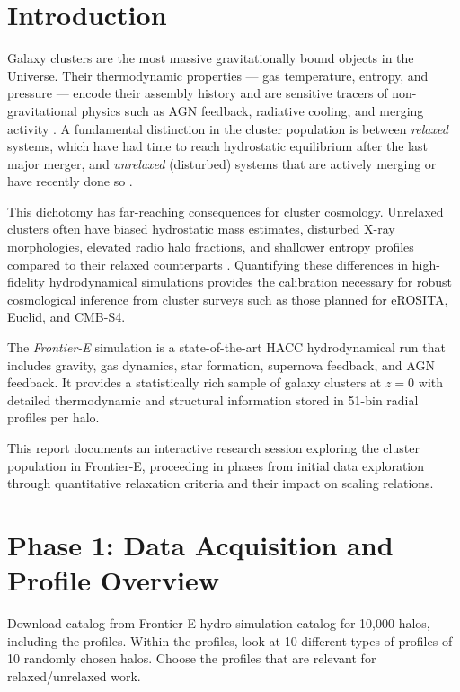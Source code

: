 \documentclass[12pt,a4paper]{article}
\begin{document}
\tableofcontents
\clearpage

\section{Introduction}
\label{sec:intro}

Galaxy clusters are the most massive gravitationally bound objects in the Universe.
Their thermodynamic properties --- gas temperature, entropy, and pressure ---
encode their assembly history and are sensitive tracers of non-gravitational
physics such as AGN feedback, radiative cooling, and merging activity
\citep{nagai2007,biffi2016}. A fundamental distinction in the cluster population
is between \emph{relaxed} systems, which have had time to reach hydrostatic
equilibrium after the last major merger, and \emph{unrelaxed} (disturbed) systems
that are actively merging or have recently done so \citep{cassano2010}.

This dichotomy has far-reaching consequences for cluster cosmology. Unrelaxed
clusters often have biased hydrostatic mass estimates, disturbed X-ray morphologies,
elevated radio halo fractions, and shallower entropy profiles compared to their
relaxed counterparts \citep{rasia2013,mantz2015}. Quantifying these differences
in high-fidelity hydrodynamical simulations provides the calibration necessary for
robust cosmological inference from cluster surveys such as those planned for
eROSITA, Euclid, and CMB-S4.

The \emph{Frontier-E} simulation \citep{hacc2016} is a state-of-the-art
HACC hydrodynamical run that includes gravity, gas dynamics, star formation,
supernova feedback, and AGN feedback. It provides a statistically rich sample
of galaxy clusters at $z=0$ with detailed thermodynamic and structural information
stored in 51-bin radial profiles per halo.

This report documents an interactive research session exploring the cluster
population in Frontier-E, proceeding in phases from initial data exploration
through quantitative relaxation criteria and their impact on scaling relations.

\section{Phase 1: Data Acquisition and Profile Overview}
\label{sec:phase1}

\begin{querybox}
\textcolor{red!80!black}{%
Download catalog from Frontier-E hydro simulation catalog for 10,000 halos,
including the profiles. Within the profiles, look at 10 different types of profiles
of 10 randomly chosen halos. Choose the profiles that are relevant for
relaxed/unrelaxed work.}
\end{querybox}
\end{document}
